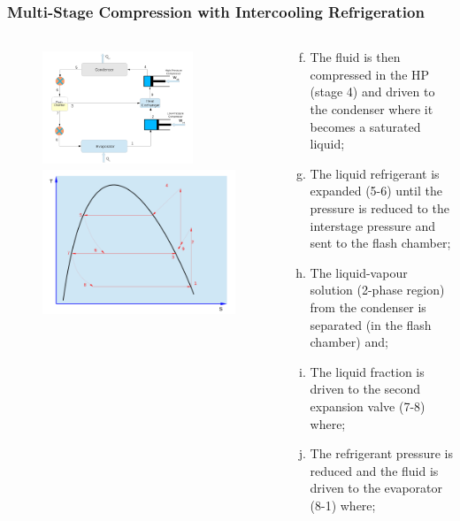 \documentclass[10pt,compress,handout,ignorenonframetext]{beamer}
\begin{document}
\begin{frame}
 \frametitle{Multi-Stage Compression with Intercooling Refrigeration}
 \begin{columns}
  \begin{column}[c]{0.45\linewidth}
   \begin{figure}%
     \vbox{
      \includegraphics[width=4.5cm,height=3.5cm,clip]{./Pics/Overview_Refrig26}
      \vspace{-.1cm}
      \includegraphics[width=4.cm,height=4.cm,clip]{./Pics/Overview_Refrig27}}
   \end{figure}  
  \end{column}  
  \begin{column}[c]{0.55\linewidth}
   \begin{enumerate}[(a)]\setcounter{enumi}{5}
    \item <1-> The fluid is then compressed in the HP (stage 4) and driven to the condenser where it becomes a saturated liquid;
    \item <2-> The liquid refrigerant is expanded (5-6) until the pressure is reduced to the interstage pressure and sent to the flash chamber;
    \item <3-> The liquid-vapour solution (2-phase region) from the condenser is separated (in the flash chamber) and;
    \item <4-> The liquid fraction is driven to the second expansion valve (7-8) where;
    \item <5-> The refrigerant pressure is reduced and the fluid is driven to the evaporator (8-1) where;
   \end{enumerate}
  \end{column}  
 \end{columns} 
\end{frame}
\end{document}
